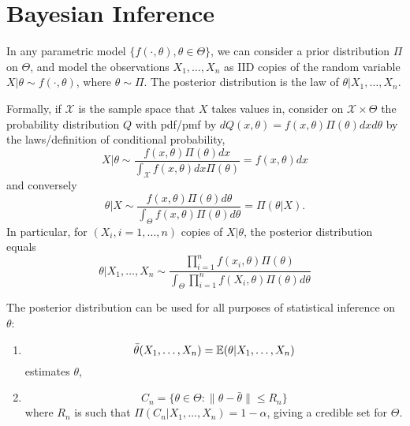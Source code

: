 
\chapter{Bayesian Inference}
\label{cha:bayesian-inference}

In any parametric model $\{ f(\cdot, \theta), \theta \in \Theta \}$,
we can consider a prior distribution $\Pi$ on $\Theta$, and model the
observations $X_{1}, \dots, X_{n}$ as IID copies of the random
variable $X|\theta \sim f(\cdot, \theta)$, where $\theta \sim \Pi$.
The posterior distribution is the law of $\theta | X_{1}, \dots, X_{n}$.

Formally, if $\mathcal{X}$ is the sample space that $X$ takes values
in, consider on $\mathcal{X} \times \Theta$ the probability
distribution $Q$ with pdf/pmf by $dQ(x, \theta) = f(x, \theta)
\Pi(\theta) dx d\theta$ by the laws/definition of conditional
probability,
\begin{equation}
  \label{eq:100}
  X|\theta \sim \frac{f(x, \theta) \Pi(\theta)
    dx}{\int_{\mathcal{X}}f(x, \theta) dx \Pi(\theta)} = f(x, \theta) dx
\end{equation} and conversely
\begin{equation}
  \label{eq:100}
  \theta | X \sim \frac{f(x, \theta) \Pi(\theta)
    d\theta}{\int_{\Theta} f(x, \theta) \Pi(\theta) d\theta} =
  \Pi(\theta | X).
\end{equation} In particular, for $(X_{i}, i = 1, \dots, n)$ \iid
copies of $X|\theta$, the posterior distribution equals
\begin{equation}
  \label{eq:100}
  \theta | X_{1}, \dots, X_{n} \sim \frac{\prod_{i=1}^{n} f(x_{i},
    \theta) \Pi(\theta)}{\int_{\Theta} \prod_{i=1}^{n}f(X_{i}, \theta)
  \Pi(\theta) d\theta}
\end{equation}


The posterior distribution can be used for all purposes of statistical
inference on $\theta$:

\begin{enumerate}
\item
  \begin{equation}
    \label{eq:100}
    \bar \theta(X_{1}, \dots, X_{n}) = \E{\theta | X_{1}, \dots, X_{n}}
  \end{equation} estimates $\theta$,
\item
  \begin{equation}
    \label{eq:100}
    C_{n} = \{ \theta \in \Theta : \| \theta - \bar \theta \| \leq
    R_{n} \}
  \end{equation} where $R_{n}$ is such that $\Pi(C_{n}| X_{1}, \dots,
  X_{n}) = 1 - \alpha$, giving a credible set for $\Theta$.
\end{enumerate}

